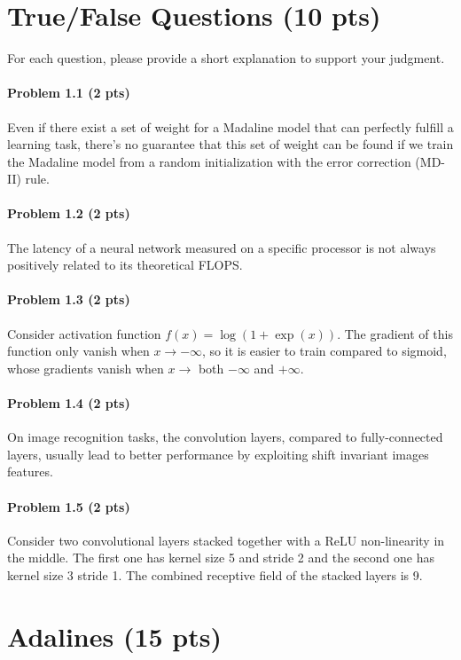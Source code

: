 

\section{True/False Questions (10 pts)} 
For each question, please provide a short explanation to support your judgment.

\paragraph{Problem 1.1 (2 pts)} Even if there exist a set of weight for a Madaline model that can perfectly fulfill a learning task, there's no guarantee that this set of weight can be found if we train the Madaline model from a random initialization with the error correction (MD-II) rule. 

\paragraph{Problem 1.2 (2 pts)} The latency of a neural network measured on a specific processor is not always positively related to its theoretical FLOPS.

\paragraph{Problem 1.3 (2 pts)} Consider activation function $f(x) = \log(1 + \exp(x))$. The gradient of this function only vanish when $x \rightarrow  -\infty$, so it is easier to train compared to sigmoid, whose gradients vanish when $x \rightarrow$ both $-\infty$ and $+\infty$.

\paragraph{Problem 1.4 (2 pts)} On image recognition tasks, the convolution layers, compared to fully-connected layers, usually lead to better performance by exploiting shift invariant images features. 

\paragraph{Problem 1.5 (2 pts)} Consider two convolutional layers stacked together with a ReLU non-linearity in the middle. The first one has kernel size 5 and stride 2 and the second one has kernel size 3 stride 1. The combined receptive field of the stacked layers is 9.


\section{Adalines (15 pts)}

